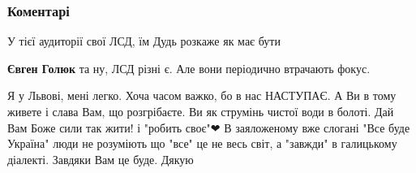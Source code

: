  
 
 
 
 
\subsubsection{Коментарі}
\label{sec:06_08_2021.fb.kushnarjev_roman.1.mova.cmt}

\begin{itemize}
 
У тієї аудиторії свої ЛСД, їм Дудь розкаже як має бути

\begin{itemize}
 
\textbf{Євген Голюк} та ну, ЛСД різні є. Але вони періодично втрачають фокус.
\end{itemize}

 

Я у Львові, мені легко. Хоча часом важко, бо в нас НАСТУПАЄ. А Ви в тому живете
і слава Вам, що розгрібаєте. Ви як струмінь чистої води в болоті. Дай Вам Боже
сили так жити! і "робить своє"❤ В заяложеному вже слогані "Все буде Україна"
люди не розуміють що "все" це не весь світ, а "завжди" в галицькому діалекті.
Завдяки Вам це буде. Дякую

\begin{itemize}
 


\end{itemize}
\end{itemize}
